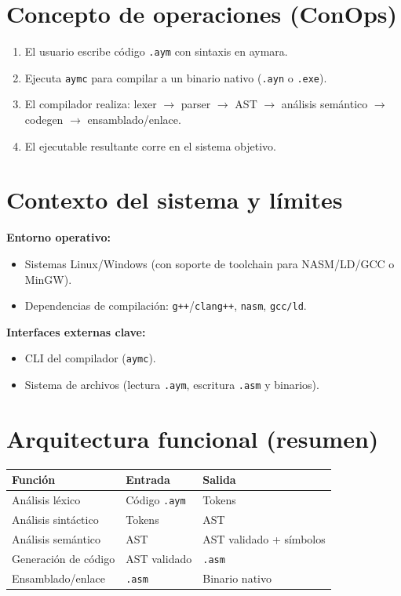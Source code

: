 \documentclass[11pt,a4paper]{article}
\begin{document}
\section{Concepto de operaciones (ConOps)}
\begin{enumerate}
    \item El usuario escribe código \texttt{.aym} con sintaxis en aymara.
    \item Ejecuta \texttt{aymc} para compilar a un binario nativo (\texttt{.ayn} o \texttt{.exe}).
    \item El compilador realiza: lexer $\rightarrow$ parser $\rightarrow$ AST $\rightarrow$ análisis semántico $\rightarrow$ codegen $\rightarrow$ ensamblado/enlace.
    \item El ejecutable resultante corre en el sistema objetivo.
\end{enumerate}

\section{Contexto del sistema y límites}
\textbf{Entorno operativo:}
\begin{itemize}
    \item Sistemas Linux/Windows (con soporte de toolchain para NASM/LD/GCC o MinGW).
    \item Dependencias de compilación: \texttt{g++}/\texttt{clang++}, \texttt{nasm}, \texttt{gcc/ld}.
\end{itemize}

\textbf{Interfaces externas clave:}
\begin{itemize}
    \item CLI del compilador (\texttt{aymc}).
    \item Sistema de archivos (lectura \texttt{.aym}, escritura \texttt{.asm} y binarios).
\end{itemize}

\section{Arquitectura funcional (resumen)}
\begin{longtable}{@{}p{4cm}p{5cm}p{5cm}@{}}
\toprule
\textbf{Función} & \textbf{Entrada} & \textbf{Salida} \\ \midrule
Análisis léxico & Código \texttt{.aym} & Tokens \\
Análisis sintáctico & Tokens & AST \\
Análisis semántico & AST & AST validado + símbolos \\
Generación de código & AST validado & \texttt{.asm} \\
Ensamblado/enlace & \texttt{.asm} & Binario nativo \\
\bottomrule
\end{longtable}
\end{document}
